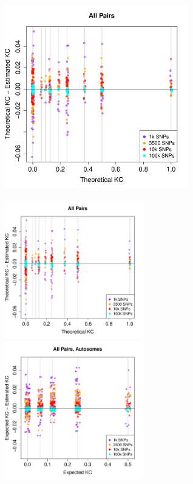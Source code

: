 \documentclass{beamer}
\begin{document}
\begin{frame}
\centering
\begin{figure}
\includegraphics[height=8cm]{../xchr_kc_estimatedVsTrue_horizLines.pdf}
\end{figure}
\end{frame}

\begin{frame}
\centering
\begin{figure}
\includegraphics[height=6cm]{../xchr_kc_estimatedVsTrue_horizLines.pdf}
\includegraphics[height=6cm]{../auto_kc_estimatedVsTrue_horizLines.pdf}
\end{figure}
\end{frame}
\end{document}
